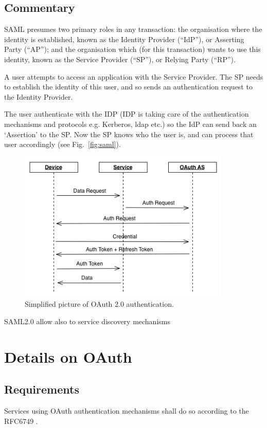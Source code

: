 \documentclass[11pt,a4paper]{ivoa}
\begin{document}
\subsection{Commentary}
SAML presumes two primary roles in any transaction: the organisation where the identity is established, 
known as the Identity Provider (``IdP''), or Asserting Party (``AP''); 
and the organisation which (for this transaction) wants to use this identity, known as the Service Provider (``SP''), 
or Relying Party (``RP'').

A user attempts to access an application with the Service Provider. 
The SP needs to establish the identity of this user, and so sends an authentication request to the Identity Provider. 

The user authenticate with the IDP (IDP is taking care of the authentication mechanisms and protocols e.g. Kerberos, ldap etc.) so the IdP can send back an `Assertion' to the SP. 
Now the SP knows who the user is, and can process that user accordingly (see Fig.~\ref{fig:saml}).
\begin{figure}
\centering
\includegraphics[width=0.9\textwidth]{SSO_image003.png}
\caption{Simplified picture of OAuth 2.0 authentication.} 
\label{fig:oauth}
\end{figure}
 


SAML2.0 allow also to service discovery mechanisms 

\section{Details on OAuth}
\subsection{Requirements}
Services using OAuth authentication mechanisms shall do so according to the RFC6749 \citep{std:RFC6742}.
\end{document}
